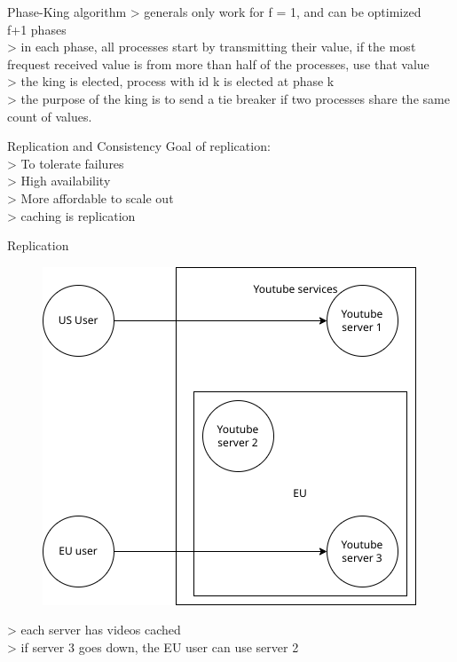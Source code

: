 \documentclass[aspectratio=1610,17pt,utf8]{beamer}
\begin{document}
\begin{frame}{Phase-King algorithm}
    > generals only work for f = 1, and can be optimized\\
    f+1 phases\\
    > in each phase, all processes start by transmitting their value, if the most frequest received value is from more than half of the processes, use that value\\
    > the king is elected, process with id k is elected at phase k\\
    > the purpose of the king is to send a tie breaker if two processes share the same count of values.
\end{frame}


\begin{frame}{Replication and Consistency}
    Goal of replication:\\
    > To tolerate failures\\
    > High availability\\
    > More affordable to scale out\\
    > caching is replication
\end{frame}

\begin{frame}{Replication}
    \begin{minipage}{.45\textwidth}
        \begin{figure}
            \includegraphics[width=\textwidth]{figures/4-replication.drawio.png}
        \end{figure}
    \end{minipage}
    \begin{minipage}{.5\textwidth}
        > each server has videos cached\\
        > if server 3 goes down, the EU user can use server 2
    \end{minipage}
\end{frame}
\end{document}
